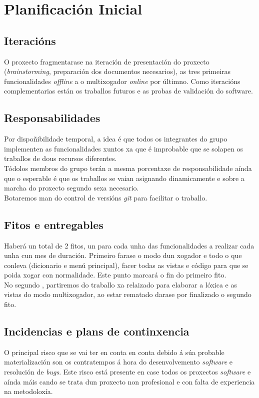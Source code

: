 \chapter{Planificación Inicial}
\label{chap:plan_inicial}

\section{Iteracións}
O proxecto fragmentarase na iteración de presentación do proxecto (\textit{brainstorming}, preparación dos documentos necesarios), as tres primeiras funcionalidades \textit{offline} a o multixogador \textit{online} por últimno. Como iteracións complementarias están os traballos futuros e as probas de validación do software.

\section{Responsabilidades}
Por dispoñibilidade temporal, a idea é que todos os integrantes do grupo implementen as funcionalidades xuntos xa que é improbable que se solapen os traballos de dous recursos diferentes.\\

Tódolos membros do grupo terán a mesma porcentaxe de responsabilidade aínda que o esperable é que os traballos se vaian asignando dinamicamente e sobre a marcha do proxecto segundo sexa necesario.\\ Botaremos man do control de versións \textit{git} para facilitar o traballo.

\section{Fitos e entregables}
Haberá un total de 2
fitos, un para cada unha das funcionalidades a realizar cada unha cun mes de duración. Primeiro farase o modo dun xogador e todo o que conleva (dicionario e menú principal), facer todas as vistas e código para que se poida xogar con normalidade. Este punto marcará o fin do primeiro fito.\\

No segundo , partiremos do traballo xa relaizado para elaborar a lóxica e as vistas do modo multixogador, ao estar rematado darase por finalizado o segundo fito.


\section{Incidencias e plans de continxencia}
O principal risco que se vai ter en conta en conta debido á súa probable materialización son os contratempos á hora do desenvolvemento \textit{software} e resolución de \textit{bugs}. Este risco está presente en case todos os proxectos \textit{software} e aínda máis cando se trata dun proxecto non profesional e con falta de experiencia na metodoloxía.\\

